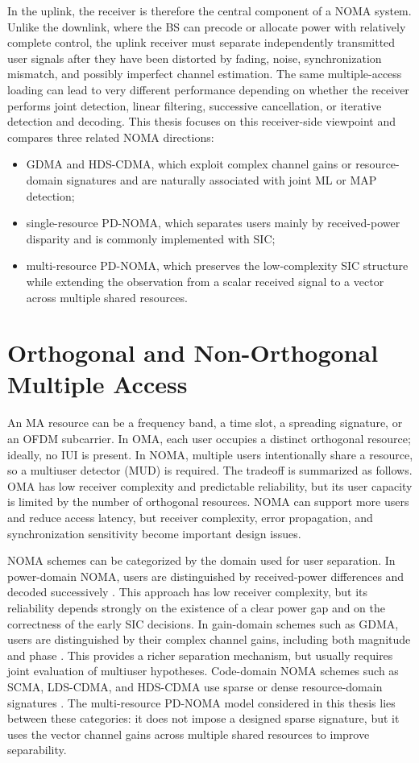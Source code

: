 In the uplink, the receiver is therefore the central component of a NOMA system. Unlike the downlink, where the BS can precode or allocate power with relatively complete control, the uplink receiver must separate independently transmitted user signals after they have been distorted by fading, noise, synchronization mismatch, and possibly imperfect channel estimation. The same multiple-access loading can lead to very different performance depending on whether the receiver performs joint detection, linear filtering, successive cancellation, or iterative detection and decoding. This thesis focuses on this receiver-side viewpoint and compares three related NOMA directions:
\begin{itemize}
    \item GDMA and HDS-CDMA, which exploit complex channel gains or resource-domain signatures and are naturally associated with joint ML or MAP detection;
    \item single-resource PD-NOMA, which separates users mainly by received-power disparity and is commonly implemented with SIC;
    \item multi-resource PD-NOMA, which preserves the low-complexity SIC structure while extending the observation from a scalar received signal to a vector across multiple shared resources.
\end{itemize}

\section{Orthogonal and Non-Orthogonal Multiple Access}

An MA resource can be a frequency band, a time slot, a spreading signature, or an OFDM subcarrier. In OMA, each user occupies a distinct orthogonal resource; ideally, no IUI is present. In NOMA, multiple users intentionally share a resource, so a multiuser detector (MUD) is required. The tradeoff is summarized as follows. OMA has low receiver complexity and predictable reliability, but its user capacity is limited by the number of orthogonal resources. NOMA can support more users and reduce access latency, but receiver complexity, error propagation, and synchronization sensitivity become important design issues.

NOMA schemes can be categorized by the domain used for user separation. In power-domain NOMA, users are distinguished by received-power differences and decoded successively \cite{islam2016pdnoma}. This approach has low receiver complexity, but its reliability depends strongly on the existence of a clear power gap and on the correctness of the early SIC decisions. In gain-domain schemes such as GDMA, users are distinguished by their complex channel gains, including both magnitude and phase \cite{hsu2019gdma,lin2023aloha}. This provides a richer separation mechanism, but usually requires joint evaluation of multiuser hypotheses. Code-domain NOMA schemes such as SCMA, LDS-CDMA, and HDS-CDMA use sparse or dense resource-domain signatures \cite{nikopour2013scma,lin2023hds}. The multi-resource PD-NOMA model considered in this thesis lies between these categories: it does not impose a designed sparse signature, but it uses the vector channel gains across multiple shared resources to improve separability.

